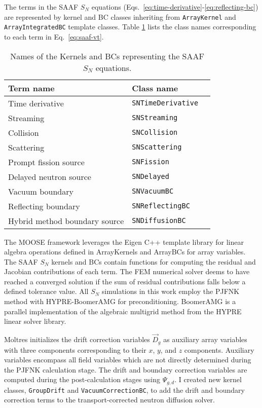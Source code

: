 The terms in the \gls{SAAF} $S_N$ equations (Eqs.\ \ref{eq:time-derivative}-\ref{eq:reflecting-bc})
are represented by kernel and BC classes inheriting from \texttt{ArrayKernel} and
\texttt{ArrayIntegratedBC} template classes. Table \ref{tab:saaf-sn} lists the class names
corresponding to each term in Eq.\ \ref{eq:saaf-vt}.
%
\begin{table}[htb]
  \centering
  \caption{Names of the Kernels and BCs representing the \gls{SAAF} $S_N$ equations.}
  \begin{tabular}{l l l}
    \toprule
    Term name & Class name \\
    \midrule
    Time derivative & \texttt{SNTimeDerivative} \\
    Streaming & \texttt{SNStreaming} \\
    Collision & \texttt{SNCollision} \\
    Scattering & \texttt{SNScattering} \\
    Prompt fission source & \texttt{SNFission} \\
    Delayed neutron source & \texttt{SNDelayed} \\
    Vacuum boundary & \texttt{SNVacuumBC} \\
    Reflecting boundary & \texttt{SNReflectingBC} \\
    Hybrid method boundary source & \texttt{SNDiffusionBC} \\
    \bottomrule
  \end{tabular}
  \label{tab:saaf-sn}
\end{table}

The \gls{MOOSE} framework leverages the Eigen \cite{guennebaud_eigen_2010} C++ template library for
linear algebra operations defined in ArrayKernels and ArrayBCs for array variables. The \gls{SAAF}
$S_N$ kernels and BCs contain functions for computing the residual and Jacobian contributions of
each term. The \gls{FEM} numerical solver deems to have reached a converged solution if the sum of
residual contributions falls below a defined tolerance value. All $S_N$ simulations in this work
employ the \gls{PJFNK} method \cite{knoll_jacobian-free_2004} with HYPRE-BoomerAMG
\cite{hypre_hypre_2022} for preconditioning. BoomerAMG is a parallel implementation of the
algebraic multigrid method from the HYPRE linear solver library.

Moltres initializes the drift correction variables $\vec{D}_g$ as auxiliary array variables
with three components corresponding to their $x$, $y$, and $z$ components. Auxiliary variables
encompass all field variables which are not directly determined during the \gls{PJFNK}
calculation stage. The drift and boundary correction variables are computed during the
post-calculation stages using $\Psi_{g,d}$.
I created new kernel classes, \texttt{GroupDrift} and \texttt{VacuumCorrectionBC}, to add the
drift and boundary correction terms to the transport-corrected neutron diffusion solver.

